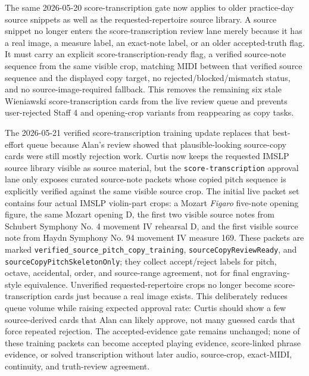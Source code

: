 The same 2026-05-20 score-transcription gate now applies to older practice-day source snippets as well as the requested-repertoire source library. A source snippet no longer enters the score-transcription review lane merely because it has a real image, a measure label, an exact-note label, or an older accepted-truth flag. It must carry an explicit score-transcription-ready flag, a verified source-note sequence from the same visible crop, matching MIDI between that verified source sequence and the displayed copy target, no rejected/blocked/mismatch status, and no source-image-required fallback. This removes the remaining six stale Wieniawski score-transcription cards from the live review queue and prevents user-rejected Staff 4 and opening-crop variants from reappearing as copy tasks.

The 2026-05-21 verified score-transcription training update replaces that best-effort queue because Alan's review showed that plausible-looking source-copy cards were still mostly rejection work. Curtis now keeps the requested IMSLP source library visible as source material, but the \texttt{score-transcription} approval lane only exposes curated source-note packets whose copied pitch sequence is explicitly verified against the same visible source crop. The initial live packet set contains four actual IMSLP violin-part crops: a Mozart \emph{Figaro} five-note opening figure, the same Mozart opening D, the first two visible source notes from Schubert Symphony No. 4 movement IV rehearsal D, and the first visible source note from Haydn Symphony No. 94 movement IV measure 169. These packets are marked \texttt{verified\_source\_pitch\_copy\_training}, \texttt{sourceCopyReviewReady}, and \texttt{sourceCopyPitchSkeletonOnly}; they collect accept/reject labels for pitch, octave, accidental, order, and source-range agreement, not for final engraving-style equivalence. Unverified requested-repertoire crops no longer become score-transcription cards just because a real image exists. This deliberately reduces queue volume while raising expected approval rate: Curtis should show a few source-derived cards that Alan can likely approve, not many guessed cards that force repeated rejection. The accepted-evidence gate remains unchanged; none of these training packets can become accepted playing evidence, score-linked phrase evidence, or solved transcription without later audio, source-crop, exact-MIDI, continuity, and truth-review agreement.

